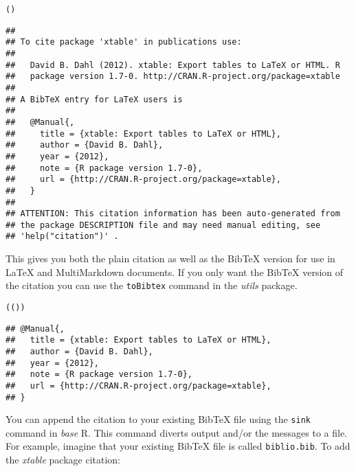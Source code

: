 {\small
\begin{knitrout}
\color{fgcolor}\begin{kframe}
\begin{alltt}
()
\end{alltt}
\begin{verbatim}
## 
## To cite package 'xtable' in publications use:
## 
##   David B. Dahl (2012). xtable: Export tables to LaTeX or HTML. R
##   package version 1.7-0. http://CRAN.R-project.org/package=xtable
## 
## A BibTeX entry for LaTeX users is
## 
##   @Manual{,
##     title = {xtable: Export tables to LaTeX or HTML},
##     author = {David B. Dahl},
##     year = {2012},
##     note = {R package version 1.7-0},
##     url = {http://CRAN.R-project.org/package=xtable},
##   }
## 
## ATTENTION: This citation information has been auto-generated from
## the package DESCRIPTION file and may need manual editing, see
## 'help("citation")' .
\end{verbatim}
\end{kframe}
\end{knitrout}

}

\noindent This gives you both the plain citation as well as the BibTeX version for use in LaTeX and MultiMarkdown documents. If you only want the BibTeX version of the citation you can use the \texttt{toBibtex} command in the \emph{utils} package.

\begin{knitrout}
\color{fgcolor}\begin{kframe}
\begin{alltt}
(())
\end{alltt}
\begin{verbatim}
## @Manual{,
##   title = {xtable: Export tables to LaTeX or HTML},
##   author = {David B. Dahl},
##   year = {2012},
##   note = {R package version 1.7-0},
##   url = {http://CRAN.R-project.org/package=xtable},
## }
\end{verbatim}
\end{kframe}
\end{knitrout}


\noindent You can append the citation to your existing BibTeX file using the \texttt{sink} command in \emph{base} R. This command diverts output and/or the messages to a file. For example, imagine that your existing BibTeX file is called \texttt{biblio.bib}. To add the \emph{xtable} package citation:


